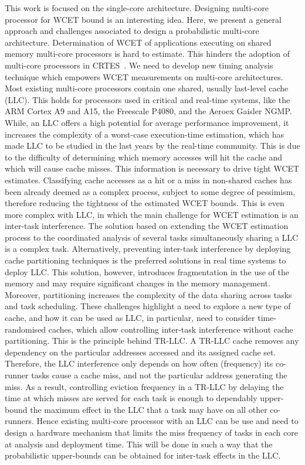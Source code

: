 This work is focused on the single-core architecture. 
Designing multi-core processor for WCET bound is an interesting idea. Here, we present a general approach and challenges associated to design a probabilistic multi-core architecture. Determination of WCET of applications executing on shared memory multi-core processors is hard to estimate. This hinders the adoption of multi-core processors in CRTES~\cite{Jalle:2014:BDT:2616606.2616668}. We need to develop new timing analysis technique which empowers WCET measurements on multi-core architectures. Most existing multi-core processors contain one shared, usually last-level cache (LLC). This holds for processors used in critical and real-time systems, like the ARM Cortex A9 and A15, the Freescale P4080, and the Aeroex Gaisler NGMP. While, an LLC offers a
high potential for average performance improvement, it increases the complexity of a 
worst-case execution-time  estimation, which has made LLC to be studied in the
last years by the real-time community. This is due to the difficulty of determining which
memory accesses will hit the cache and which will cause cache misses. This information is necessary to
drive tight WCET estimates. Classifying cache accesses as a hit or a miss in non-shared
caches has been already deemed as a complex process, subject to some degree of
pessimism, therefore reducing the tightness of the estimated WCET bounds. This is
even more complex with LLC, in which the main challenge for WCET estimation is an inter-task interference. The solution based on
extending the WCET estimation process to the coordinated analysis of several tasks
simultaneously sharing a LLC is a complex task. Alternatively, preventing inter-task
interference by deploying cache partitioning techniques is the preferred solutions in real
time systems to deploy LLC. This solution, however, introduces fragmentation in the
use of the memory and may require significant changes in the memory management.
Moreover, partitioning increases the complexity of the data sharing across tasks and task
scheduling. These challenges highlight a need to explore a new type of cache, and how it can be
used as LLC, in particular, need to consider time-randomised  caches, which allow
controlling inter-task interference without cache partitioning. This is the principle behind TR-LLC.
A TR-LLC cache removes any dependency on the particular addresses accessed and
its assigned cache set. Therefore, the LLC interference  only depends
on how often (frequency) its co-runner tasks cause a cache miss, and not the particular
address generating the miss. As a result, controlling eviction frequency in a TR-LLC by
delaying the time at which misses are served for each task  is enough to dependably
upper-bound the maximum effect in the LLC that a task may have on all other co-runners. Hence existing multi-core processor with an LLC can be use and
need to design a hardware mechanism that limits the miss frequency of tasks in each core at
analysis and deployment time. This will be done in such a way that the probabilistic upper-bounds can be obtained for inter-task effects in the LLC. 

